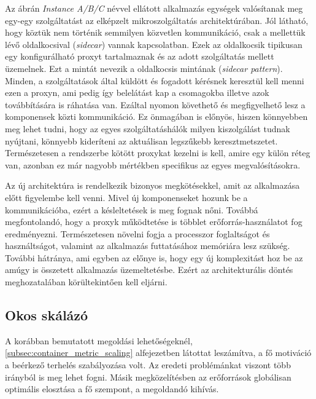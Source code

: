 Az ábrán \textit{Instance A/B/C} névvel ellátott alkalmazás egységek valósítanak meg egy-egy szolgáltatást az elképzelt mikroszolgáltatás architektúrában. 
Jól látható, hogy köztük nem történik semmilyen közvetlen kommunikáció, csak a mellettük lévő oldalkocsival (\textit{sidecar}) vannak kapcsolatban.
Ezek az oldalkocsik tipikusan egy konfigurálható proxyt tartalmaznak és az adott szolgáltatás mellett üzemelnek.
Ezt a mintát nevezik a oldalkocsis mintának (\textit{sidecar pattern})\citep{sidecarPattern}.
Minden, a szolgáltatások által küldött és fogadott kérésnek keresztül kell menni ezen a proxyn, ami pedig így belelátást kap a csomagokba illetve azok továbbítására is ráhatása van.
Ezáltal nyomon követhető és megfigyelhető lesz a komponensek közti kommunikáció.
Ez önmagában is előnyös, hiszen könnyebben meg lehet tudni, hogy az egyes szolgáltatáshálók milyen kiszolgálást tudnak nyújtani, könnyebb kideríteni az aktuálisan legszűkebb keresztmetszetet.
Természetesen a rendszerbe kötött proxykat kezelni is kell, amire egy külön réteg van, azonban ez már nagyobb mértékben specifikus az egyes megvalósításokra.

Az új architektúra is rendelkezik bizonyos megkötésekkel, amit az alkalmazása előtt figyelembe kell venni.
Mivel új komponenseket hozunk be a kommunikációba, ezért a késleltetések is meg fognak nőni.
Továbbá megfontolandó, hogy a proxyk működtetése is többlet erőforrás-használatot fog eredményezni. 
Természetesen növelni fogja a processzor foglaltságot és használtságot, valamint az alkalmazás futtatásához memóriára lesz szükség.
További hátránya, ami egyben az előnye is, hogy egy új komplexitást hoz be az amúgy is összetett alkalmazás üzemeltetésbe. 
Ezért az architekturális döntés meghozatalában körültekintően kell eljárni.



\subsection{Okos skálázó}

A korábban bemutatott megoldási lehetőségeknél, \ref{subsec:container_metric_scaling} alfejezetben látottat leszámítva, a fő motiváció a beérkező terhelés szabályozása volt.
Az eredeti problémánkat viszont több irányból is meg lehet fogni.
Másik megközelítésben az erőforrások globálisan optimális elosztása a fő szempont, a megoldandó kihívás.

